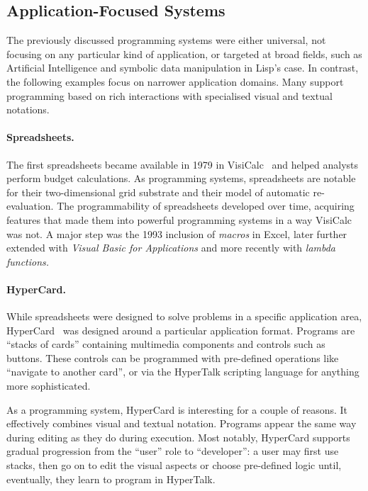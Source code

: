 \hypertarget{application-focused-systems}{%
\subsection{Application-Focused
Systems}\label{application-focused-systems}}

The previously discussed programming systems were either universal, not
focusing on any particular kind of application, or targeted at broad
fields, such as Artificial Intelligence and symbolic data manipulation
in Lisp's case. In contrast, the following examples focus on narrower
application domains. Many support programming based on rich interactions
with specialised visual and textual notations.

\paragraph{Spreadsheets.}

The first spreadsheets became available in 1979 in
VisiCalc~\cite{VisiCalc, VisiCalc2} and helped analysts perform budget
calculations. As programming systems, spreadsheets are notable for their
two-dimensional grid substrate and their model of automatic
re-evaluation. The programmability of spreadsheets developed over time,
acquiring features that made them into powerful programming systems in a
way VisiCalc was not. A major step was the 1993 inclusion of
\emph{macros} in Excel, later further extended with \emph{Visual Basic
for Applications} and more recently with \emph{lambda functions.}

\paragraph{HyperCard.}

While spreadsheets were designed to solve problems in a specific
application area, HyperCard~\cite{HyperCard} was designed around a
particular application format. Programs are ``stacks of cards''
containing multimedia components and controls such as buttons. These
controls can be programmed with pre-defined operations like ``navigate
to another card'', or via the HyperTalk scripting language for anything
more sophisticated.

As a programming system, HyperCard is interesting for a couple of
reasons. It effectively combines visual and textual notation. Programs
appear the same way during editing as they do during execution. Most
notably, HyperCard supports gradual progression from the ``user'' role
to ``developer'': a user may first use stacks, then go on to edit the
visual aspects or choose pre-defined logic until, eventually, they learn
to program in HyperTalk.

